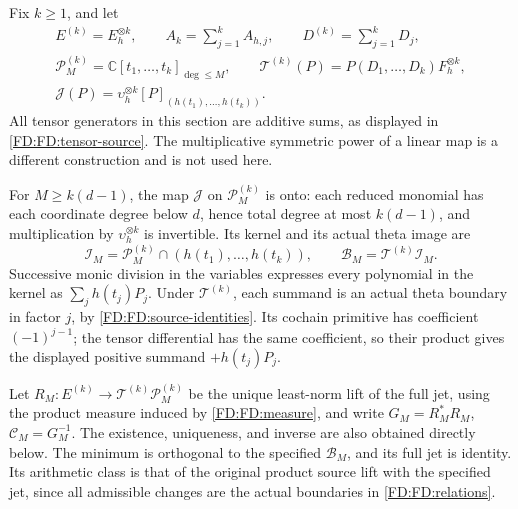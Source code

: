 Fix \(k\ge1\), and let
\begin{equation}
\begin{gathered}
E^{(k)}=E_h^{\otimes k},\qquad
A_k=\sum_{j=1}^k A_{h,j},\qquad D^{(k)}=\sum_{j=1}^kD_j,\\
\mathcal P_M^{(k)}=\mathbb C[t_1,\ldots,t_k]_{\deg\le M},\qquad
\mathcal T^{(k)}(P)=P(D_1,\ldots,D_k)F_h^{\otimes k},\\
\mathcal J(P)=\upsilon_h^{\otimes k}
[P]_{(h(t_1),\ldots,h(t_k))}.
\end{gathered}
\tag{FD.6}\label{FD:FD:tensor-source}
\end{equation}
All tensor generators in this section are additive sums, as displayed in
\eqref{FD:FD:tensor-source}.  The multiplicative symmetric power of a linear
map is a different construction and is not used here.

For \(M\ge k(d-1)\), the map \(\mathcal J\) on
\(\mathcal P_M^{(k)}\) is onto: each reduced monomial has each coordinate
degree below \(d\), hence total degree at most \(k(d-1)\), and multiplication
by \(\upsilon_h^{\otimes k}\) is invertible.  Its kernel and its actual
theta image are
\begin{equation}
\mathcal I_M=\mathcal P_M^{(k)}\cap(h(t_1),\ldots,h(t_k)),\qquad
\mathcal B_M=\mathcal T^{(k)}\mathcal I_M.
\tag{FD.7}\label{FD:FD:relations}
\end{equation}
Successive monic division in the variables expresses every polynomial in
the kernel as \(\sum_jh(t_j)P_j\).  Under \(\mathcal T^{(k)}\), each
summand is an actual theta boundary in factor \(j\), by
\eqref{FD:FD:source-identities}.  Its cochain primitive has coefficient
\((-1)^{j-1}\); the tensor differential has the same coefficient, so their
product gives the displayed positive summand \(+h(t_j)P_j\).

Let \(R_M:E^{(k)}\to\mathcal T^{(k)}\mathcal P_M^{(k)}\) be the unique
least-norm lift of the full jet, using the product measure induced by
\eqref{FD:FD:measure}, and write
\(G_M=R_M^*R_M\), \(\mathcal C_M=G_M^{-1}\).
The existence, uniqueness, and inverse are also obtained directly below.
The minimum is orthogonal to the specified \(\mathcal B_M\), and its
full jet is identity.  Its arithmetic class is that of the original
product source lift with the specified jet, since all admissible
changes are the actual boundaries in \eqref{FD:FD:relations}.

